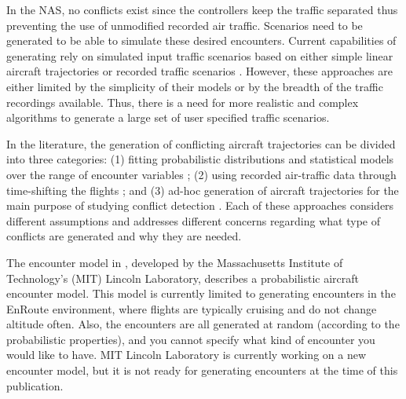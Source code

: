 In the NAS, no conflicts exist since the controllers keep the traffic separated thus preventing the use of unmodified recorded air traffic. Scenarios need to be generated to be able to simulate these desired encounters. Current capabilities of generating rely on simulated input traffic scenarios based on either simple linear aircraft trajectories or recorded traffic scenarios \cite{oaks:2001, paglione:2003, oaks:2002a, oaks:2002b, ritchie:2016}. However, these approaches are either limited by the simplicity of their models or by the breadth of the traffic recordings available. Thus, there is a need for more realistic and complex algorithms to generate a large set of user specified traffic scenarios.

In the literature, the generation of conflicting aircraft trajectories can be divided into three categories: (1) fitting probabilistic distributions and statistical models over the range of encounter variables \cite{kochenderfer-correlated:2008, kochenderfer-uncorrelated:2008}; (2) using recorded air-traffic data through time-shifting the flights \cite{oaks:2001, paglione:2003, oaks:2002a, oaks:2002b, ritchie:2016}; and (3) ad-hoc generation of aircraft trajectories for the main purpose of studying conflict detection \cite{malaek:2011, ming:2011, meng:2012, liu:2014, yang:2017}. Each of these approaches considers different assumptions and addresses different concerns regarding what type of conflicts are generated and why they are needed.

The encounter model in \cite{kochenderfer-correlated:2008}, developed by the Massachusetts Institute of Technology's (MIT) Lincoln Laboratory, describes a probabilistic aircraft encounter model. This model is currently limited to generating encounters in the EnRoute environment, where flights are typically cruising and do not change altitude often. Also, the encounters are all generated at random (according to the probabilistic properties), and you cannot specify what kind of encounter you would like to have. MIT Lincoln Laboratory is currently working on a new encounter model, but it is not ready for generating encounters at the time of this publication.

